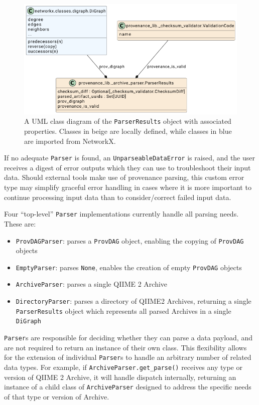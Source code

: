 \begin{figure}[htp]
\centering
\includegraphics[width=\textwidth]{figures/ParserResultsUML.png}
\caption[UML Class diagram of the ParserResults class and its components]%
{A UML class diagram of the \texttt{ParserResults} object with associated properties.
Classes in beige are locally defined, while classes in blue are imported from
NetworkX.}
\label{fig:ParserResultsUML}
\end{figure}

If no adequate \texttt{Parser} is found, an \texttt{UnparseableDataError} is raised, and the user
receives a digest of error outputs which they can use to troubleshoot their
input data. Should external tools make use of provenance parsing, this custom
error type may simplify graceful error handling in cases where it is more
important to continue processing input data than to consider/correct failed
input data. 

Four “top-level” \texttt{Parser} implementations currently handle all parsing needs.
These are:
\begin{itemize}
    \item \texttt{ProvDAGParser}: parses a \texttt{ProvDAG} object, enabling the
        copying of \texttt{ProvDAG} objects
    \item \texttt{EmptyParser}: parses \texttt{None}, enables the creation of
        empty \texttt{ProvDAG} objects
    \item \texttt{ArchiveParser}: parses a single QIIME 2 Archive
    \item \texttt{DirectoryParser}: parses a directory of QIIME2 Archives,
        returning a single \texttt{ParserResults} object which represents all parsed
        Archives in a single \texttt{DiGraph}
\end{itemize}

\texttt{Parser}s are responsible for deciding whether they can parse a data payload, and
are not required to return an instance of their own class. This flexibility
allows for the extension of individual \texttt{Parser}s to handle an arbitrary number of
related data types. For example, if \texttt{ArchiveParser.get\_parse()} receives any type
or version of QIIME 2 Archive, it will handle dispatch internally, returning an
instance of a child class of \texttt{ArchiveParser} designed to address the specific
needs of that type or version of Archive.

